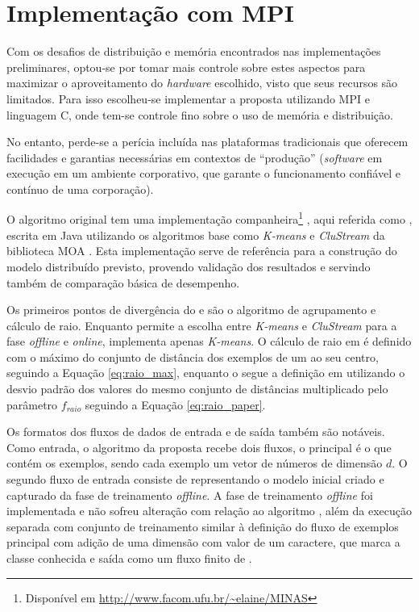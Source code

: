 
\section{Implementação com MPI}

Com os desafios de distribuição e memória encontrados nas implementações
preliminares, optou-se por tomar mais controle sobre estes aspectos para
maximizar o aproveitamento do \emph{hardware} escolhido, visto que seus recursos
são limitados.
Para isso escolheu-se implementar a proposta utilizando \acf{MPI} e linguagem C,
onde tem-se controle fino sobre o uso de memória e distribuição. 

No entanto,
perde-se a perícia incluída nas plataformas tradicionais que oferecem
facilidades e garantias necessárias em contextos de ``produção''
(\emph{software} em execução em um ambiente corporativo, que garante o
funcionamento confiável e contínuo de uma corporação).

O algoritmo \minas original \cite{Faria2016minas} tem uma implementação
companheira\footnote{Disponível em \url{http://www.facom.ufu.br/~elaine/MINAS}}
\cite{Faria2013source}, aqui referida como , escrita em Java utilizando
os algoritmos base como \emph{K-means} e \emph{CluStream} da biblioteca MOA
\cite{MOA}.
Esta implementação serve de referência para a construção do modelo distribuído previsto, provendo validação dos
resultados e servindo também de comparação básica de desempenho.

Os primeiros pontos de divergência do \mfog e  são o algoritmo de
agrupamento e cálculo de raio.
Enquanto  permite a escolha entre \emph{K-means} e \emph{CluStream} para a
fase \emph{offline} e \emph{online}, \mfog implementa apenas \emph{K-means}.
O cálculo de raio em  é definido com o máximo do conjunto de distância
dos exemplos de um \mcluster ao seu centro, seguindo a Equação \ref{eq:raio_max},
enquanto o \mfog segue a definição em  utilizando o
desvio padrão dos valores do mesmo conjunto de distâncias multiplicado pelo
parâmetro $f_{raio}$ seguindo a Equação \ref{eq:raio_paper}.

\newcommand{\val}{$\vec{v}\,$\xspace}
Os formatos dos fluxos de dados de entrada e de saída também são notáveis. Como
entrada, o algoritmo da proposta recebe dois fluxos, o principal é o que contém
os exemplos, sendo cada exemplo um vetor de números de dimensão $d$.
O segundo fluxo de entrada consiste de \mclusters representando o modelo inicial
criado e capturado da fase de treinamento \emph{offline}.
A fase de treinamento \emph{offline} foi implementada e não sofreu alteração
com relação ao algoritmo \minas \cite{Faria2016minas}, além da execução separada
com conjunto de treinamento similar à definição do fluxo de exemplos principal
com adição de uma dimensão com valor de um caractere, que marca a classe conhecida
e saída como um fluxo finito de \mclusters.


